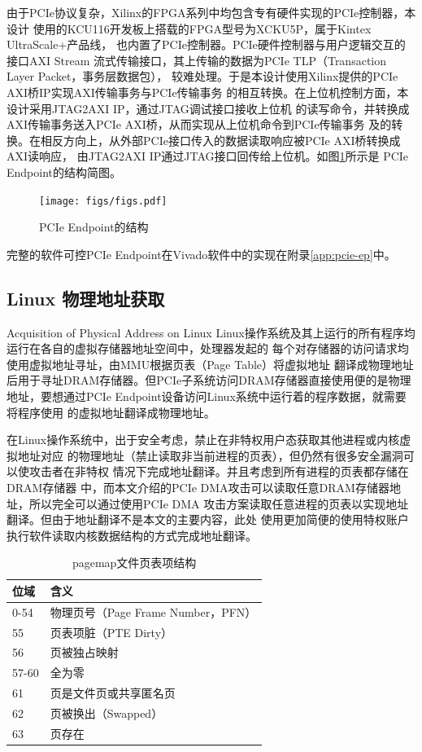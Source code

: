 由于PCIe协议复杂，Xilinx的FPGA系列中均包含专有硬件实现的PCIe控制器，本设计
使用的KCU116开发板上搭载的FPGA型号为XCKU5P，属于Kintex UltraScale+产品线，
也内置了PCIe控制器\cite{pg213}。PCIe硬件控制器与用户逻辑交互的接口AXI Stream
流式传输接口，其上传输的数据为PCIe TLP（Transaction Layer Packet，事务层数据包），
较难处理。于是本设计使用Xilinx提供的PCIe AXI桥IP实现AXI传输事务与PCIe传输事务
的相互转换。在上位机控制方面，本设计采用JTAG2AXI IP，通过JTAG调试接口接收上位机
的读写命令，并转换成AXI传输事务送入PCIe AXI桥，从而实现从上位机命令到PCIe传输事务
及的转换。在相反方向上，从外部PCIe接口传入的数据读取响应被PCIe AXI桥转换成AXI读响应，
由JTAG2AXI IP通过JTAG接口回传给上位机。如图\ref{fig:pcie-ep}所示是
PCIe Endpoint的结构简图。

\begin{figure}[ht]
	\centering
	\texttt{[image: figs/figs.pdf]}
	\caption{PCIe Endpoint的结构}
	\label{fig:pcie-ep}
\end{figure}

完整的软件可控PCIe Endpoint在Vivado软件中的实现在附录\ref{app:pcie-ep}中。

\subsection{Linux 物理地址获取}{Acquisition of Physical Address on Linux}
Linux操作系统及其上运行的所有程序均运行在各自的虚拟存储器地址空间中，处理器发起的
每个对存储器的访问请求均使用虚拟地址寻址，由MMU根据页表（Page Table）将虚拟地址
翻译成物理地址后用于寻址DRAM存储器。但PCIe子系统访问DRAM存储器直接使用便的是物理
地址，要想通过PCIe Endpoint设备访问Linux系统中运行着的程序数据，就需要将程序使用
的虚拟地址翻译成物理地址。

在Linux操作系统中，出于安全考虑，禁止在非特权用户态获取其他进程或内核虚拟地址对应
的物理地址（禁止读取非当前进程的页表），但仍然有很多安全漏洞可以使攻击者在非特权
情况下完成地址翻译\cite{chen2011linux}。并且考虑到所有进程的页表都存储在DRAM存储器
中，而本文介绍的PCIe DMA攻击可以读取任意DRAM存储器地址，所以完全可以通过使用PCIe DMA
攻击方案读取任意进程的页表以实现地址翻译。但由于地址翻译不是本文的主要内容，此处
使用更加简便的使用特权账户执行软件读取内核数据结构的方式完成地址翻译。

\begin{table}[!ht]
	\centering
\begin{threeparttable}[b]
\caption{pagemap文件页表项结构}
\begin{tabular}{x{0.2\textwidth}x{0.4\textwidth}}
	\toprule
	位域 & 含义 \\
	-54 & 物理页号（Page Frame Number，PFN） \\
	55 & 页表项脏（PTE Dirty） \\
	56 & 页被独占映射 \\
	57-60 & 全为零 \\
	61 & 页是文件页或共享匿名页 \\
	62 & 页被换出（Swapped） \\
	63 & 页存在 \\
	\bottomrule
\end{tabular}
\label{tab:pagemap-entry}
\end{threeparttable}
\end{table}

